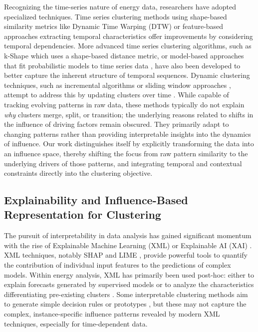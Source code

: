 \documentclass[final,authoryear,3p,times,review,sort&compress]{elsarticle}
\begin{document}
Recognizing the time-series nature of energy data, researchers have adopted specialized techniques. Time series clustering methods using shape-based similarity metrics like Dynamic Time Warping (DTW) \citep{zhang2022clustering, shen2025dtw} or feature-based approaches extracting temporal characteristics \citep{choksi2020feature} offer improvements by considering temporal dependencies. More advanced time series clustering algorithms, such as k-Shape \citep{paparrizos2015kshape} which uses a shape-based distance metric, or model-based approaches that fit probabilistic models to time series data \citep{alonso2006model}, have also been developed to better capture the inherent structure of temporal sequences. Dynamic clustering techniques, such as incremental algorithms \citep{jiang2021incremental} or sliding window approaches \citep{benitez2022automated}, attempt to address this by updating clusters over time \citep{zhang2023dynamic}. While capable of tracking evolving patterns in raw data, these methods typically do not explain \textit{why} clusters merge, split, or transition; the underlying reasons related to shifts in the influence of driving factors remain obscured. They primarily adapt to changing patterns rather than providing interpretable insights into the dynamics of influence. Our work distinguishes itself by explicitly transforming the data into an influence space, thereby shifting the focus from raw pattern similarity to the underlying drivers of those patterns, and integrating temporal and contextual constraints directly into the clustering objective.

\subsection{Explainability and Influence-Based Representation for Clustering}
The pursuit of interpretability in data analysis has gained significant momentum with the rise of Explainable Machine Learning (XML) or Explainable AI (XAI) \citep{abusitta2024survey}. XML techniques, notably SHAP \citep{van2022tractability} and LIME \citep{garreau2020explaining}, provide powerful tools to quantify the contribution of individual input features to the predictions of complex models. Within energy analysis, XML has primarily been used post-hoc: either to explain forecasts generated by supervised models \citep{shajalal2024forecastexplainer} or to analyze the characteristics differentiating pre-existing clusters \citep{cohen2024shapley}. Some interpretable clustering methods aim to generate simple decision rules or prototypes \citep{hu2025interpretable}, but these may not capture the complex, instance-specific influence patterns revealed by modern XML techniques, especially for time-dependent data.
\end{document}
